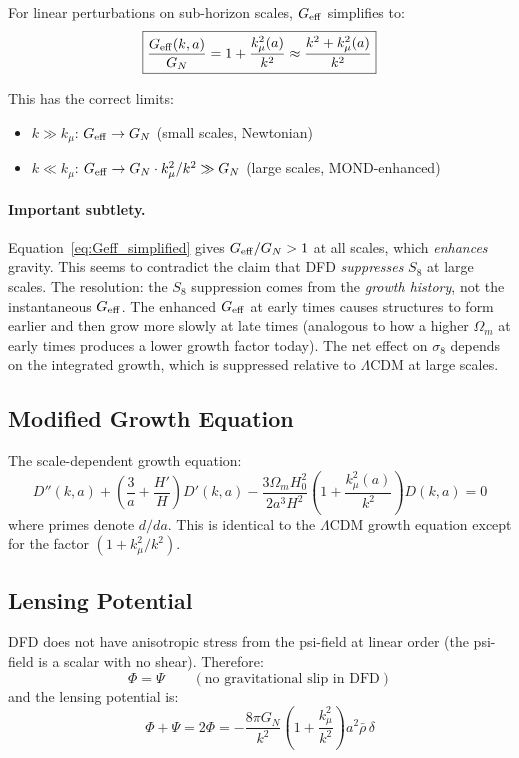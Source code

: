 \documentclass[11pt,a4paper]{article}
\newcommand{\LCDM}{$\Lambda$CDM}
\newcommand{\kmu}{k_\mu}
\newcommand{\Geff}{G_{\rm eff}}
\begin{document}
For linear perturbations on sub-horizon scales, $\Geff$ simplifies to:
\begin{equation}
\boxed{
\frac{\Geff(k,a)}{G_N} = 1 + \frac{\kmu^2(a)}{k^2}
\approx \frac{k^2 + \kmu^2(a)}{k^2}
}
\label{eq:Geff_simplified}
\end{equation}

This has the correct limits:
\begin{itemize}[nosep]
\item $k \gg \kmu$: $\Geff \to G_N$ (small scales, Newtonian)
\item $k \ll \kmu$: $\Geff \to G_N \cdot \kmu^2/k^2 \gg G_N$
  (large scales, MOND-enhanced)
\end{itemize}

\paragraph{Important subtlety.} Equation~\eqref{eq:Geff_simplified}
gives $\Geff/G_N > 1$ at all scales, which \emph{enhances} gravity.
This seems to contradict the claim that DFD \emph{suppresses} $S_8$
at large scales. The resolution: the $S_8$ suppression comes from the
\emph{growth history}, not the instantaneous $\Geff$. The enhanced
$\Geff$ at early times causes structures to form earlier and then
grow more slowly at late times (analogous to how a higher $\Omega_m$
at early times produces a lower growth factor today). The net effect
on $\sigma_8$ depends on the integrated growth, which is suppressed
relative to \LCDM{} at large scales.

\subsection{Modified Growth Equation}

The scale-dependent growth equation:
\begin{equation}
\boxed{
D''(k,a) + \left(\frac{3}{a} + \frac{H'}{H}\right)D'(k,a)
- \frac{3\Omega_m H_0^2}{2a^3 H^2}\left(1 + \frac{\kmu^2(a)}{k^2}\right)
D(k,a) = 0
}
\label{eq:growth}
\end{equation}
where primes denote $d/da$. This is identical to the \LCDM{} growth
equation except for the factor $(1 + \kmu^2/k^2)$.

\subsection{Lensing Potential}

DFD does not have anisotropic stress from the psi-field at linear
order (the psi-field is a scalar with no shear). Therefore:
\begin{equation}
\Phi = \Psi \qquad (\text{no gravitational slip in DFD})
\end{equation}
and the lensing potential is:
\begin{equation}
\Phi + \Psi = 2\Phi = -\frac{8\pi G_N}{k^2}\left(1 + \frac{\kmu^2}{k^2}\right)
a^2\bar{\rho}\,\delta
\end{equation}
\end{document}
